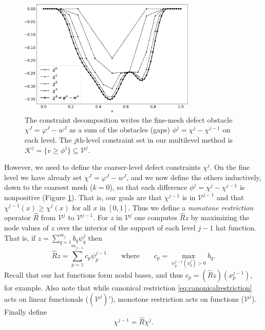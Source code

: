 \documentclass[letterpaper,final,12pt,reqno]{amsart}
\theoremstyle{claim}
\numberwithin{equation}{section}
\numberwithin{figure}{section}
\numberwithin{table}{section}
\begin{document}
\begin{figure}
\includegraphics[width=0.75\textwidth]{fixfigs/decomp_defect.pdf}
\caption{The constraint decomposition writes the fine-mesh defect obstacle $\chi^J = \varphi^J - w^J$ as a sum of the obstacles (gaps) $\phi^j = \chi^j - \chi^{j-1}$ on each level.  The $j$th-level constraint set in our multilevel method is $\mathcal{K}^j = \{v \ge \phi^j\} \subseteq \mathcal{V}^j$.}
\label{fig:gooddecomposition}
\end{figure}

However, we need to define the coarser-level defect constraints $\chi^j$.  On the fine level we have already set $\chi^J = \varphi^J - w^J$, and we now define the others inductively, down to the coarsest mesh ($k=0$), so that each difference $\phi^j = \chi^j - \chi^{j-1}$ is nonpositive (Figure \ref{fig:gooddecomposition}).  That is, our goals are that $\chi^{j-1}$ is in $\mathcal{V}^{j-1}$ and that $\chi^{j-1}(x) \ge \chi^j(x)$ for all $x$ in $[0,1]$.  Thus we define a \emph{monotone restriction} operator $\hat R$ from $\mathcal{V}^j$ to $\mathcal{V}^{j-1}$.  For $z$ in $\mathcal{V}^j$ one computes $\hat R z$ by maximizing the node values of $z$ over the interior of the support of each level $j-1$ hat function.  That is, if $z = \sum_{q=1}^{m_j} b_q \psi_q^j$ then
\begin{equation}
  \hat R z = \sum_{p=1}^{m_{j-1}} c_p \psi_p^{j-1} \qquad \text{where} \qquad c_p = \max_{\psi_p^{j-1}(x_q^j) > 0} b_q.  \label{eq:monotonerestriction}
\end{equation}
Recall that our hat functions form nodal bases, and thus $c_p = (\hat R z)(x_p^{j-1})$, for example.  Also note that while canonical restriction \eqref{eq:canonicalrestriction} acts on linear functionals ($(\mathcal{V}^j)'$), monotone restriction acts on functions ($\mathcal{V}^j$).  Finally define
\begin{equation}
  \chi^{j-1} = \hat R \chi^j.  \label{eq:chik}
\end{equation}
\end{document}
